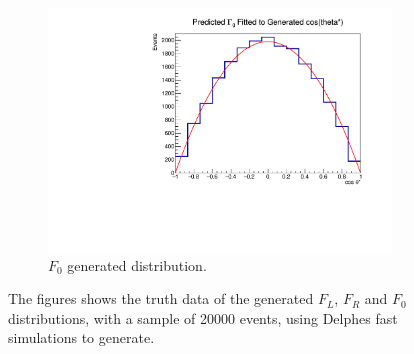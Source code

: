 \documentclass[12pt,a4paper]{article}
\numberwithin{equation}{section}
\begin{document}
\begin{figure}[t!]
\begin{subfigure}[t]{0.5\textwidth}
        \includegraphics[width=1.0\textwidth]{figures/delphes_gen0}
        \caption{$F_0$ generated distribution.}
    \end{subfigure}
    \caption{The figures shows the truth data of the generated $F_L$, $F_R$ and
      $F_0$ distributions, with a sample of 20000 events, using Delphes fast
      simulations to generate.}\label{fig:delphesdist}
\end{figure}
\end{document}
